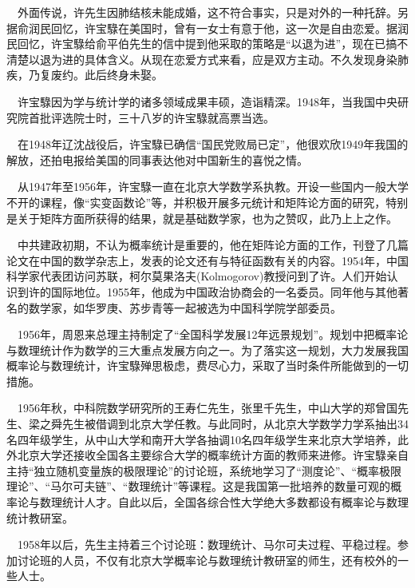 \begin{frame}
	$\quad$外面传说，许先生因肺结核未能成婚，这不符合事实，只是对外的一种托辞。另据俞润民回忆，许宝騄在美国时，曾有一女士有意于他，这一次是自由恋爱。据润民回忆，许宝騄给俞平伯先生的信中提到他采取的策略是“以退为进”，现在已搞不清楚以退为进的具体含义。从现在恋爱方式来看，应是双方主动。不久发现身染肺疾，乃复废约。此后终身未娶。
	
	$\quad$许宝騄因为学与统计学的诸多领域成果丰硕，造诣精深。1948年，当我国中央研究院首批评选院士时，三十八岁的许宝騄就高票当选。
	
	$\quad$在1948年辽沈战役后，许宝騄已确信“国民党败局已定”，他很欢欣1949年我国的解放，还拍电报给美国的同事表达他对中国新生的喜悦之情。
	
	$\quad$从1947年至1956年，许宝騄一直在北京大学数学系执教。开设一些国内一般大学不开的课程，像“实变函数论”等，并积极开展多元统计和矩阵论方面的研究，特别是关于矩阵方面所获得的结果，就是基础数学家，也为之赞叹，此乃上上之作。
\end{frame}

\begin{frame}
	$\quad$中共建政初期，不认为概率统计是重要的，他在矩阵论方面的工作，刊登了几篇论文在中国的数学杂志上，发表的论文还有与特征函数有关的内容。1954年，中国科学家代表团访问苏联，柯尔莫果洛夫(Kolmogorov)教授问到了许。人们开始认识到许的国际地位。1955年，他成为中国政治协商会的一名委员。同年他与其他著名的数学家，如华罗庚、苏步青等一起被选为中国科学院学部委员。
	
	$\quad$1956年，周恩来总理主持制定了“全国科学发展12年远景规划”。规划中把概率论与数理统计作为数学的三大重点发展方向之一。为了落实这一规划，大力发展我国概率论与数理统计，许宝騄殚思极虑，费尽心力，采取了当时条件所能做到的一切措施。
	
\end{frame}

\begin{frame}
	$\quad$1956年秋，中科院数学研究所的王寿仁先生，张里千先生，中山大学的郑曾国先生、梁之舜先生被借调到北京大学任教。与此同时，从北京大学数学力学系抽出34名四年级学生，从中山大学和南开大学各抽调10名四年级学生来北京大学培养，此外北京大学还接收全国各主要综合大学的概率统计方面的教师来进修。许宝騄亲自主持“独立随机变量族的极限理论”的讨论班，系统地学习了“测度论”、“概率极限理论”、“马尔可夫链”、“数理统计”等课程。这是我国第一批培养的数量可观的概率论与数理统计人才。自此以后，全国各综合性大学绝大多数都设有概率论与数理统计教研室。
	
	$\quad$1958年以后，先生主持着三个讨论班：数理统计、马尔可夫过程、平稳过程。参加讨论班的人员，不仅有北京大学概率论与数理统计教研室的师生，还有校外的一些人士。
	
\end{frame}

